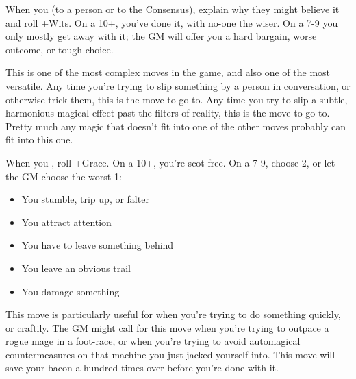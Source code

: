 \begin{multicols}{3}
  \columnbreak
    
  \begin{move}
    When you  (to a person or to the Consensus),
    explain why they might believe it and roll +Wits. On a 10+, you've
    done it, with no-one the wiser. On a 7-9 you only mostly get away
    with it; the GM will offer you a hard bargain, worse outcome, or
    tough choice.
\begin{movedetail}
  This is one of the most complex moves in the game, and also one of
  the most versatile. Any time you're trying to slip something by a
  person in conversation, or otherwise trick them, this is the move to
  go to. Any time you try to slip a subtle, harmonious magical
  effect past the filters of reality, this is the move to go
  to. Pretty much any magic that doesn't fit into one of the other
  moves probably can fit into this one.
\end{movedetail}
  \end{move}

  \vspace{1em}
  
  \SEPARATOR

  \begin{move}
    When you , roll
    +Grace. On a 10+, you're scot free. On a 7-9, choose 2, or let
    the GM choose the worst 1:
    \begin{itemize}
      \setlength\itemsep{0em}
    \item You stumble, trip up, or falter
    \item You attract attention
    \item You have to leave something behind
    \item You leave an obvious trail
    \item You damage something
    \end{itemize}
\begin{movedetail}
  This move is particularly useful for when you're trying to do
  something quickly, or craftily. The GM might call for this move when
  you're trying to outpace a rogue mage in a foot-race, or when you're
  trying to avoid automagical countermeasures on that machine you just
  jacked yourself into. This move will save your bacon a hundred times
  over before you're done with it.
\end{movedetail}
  \end{move}

  \SEPARATOR


\end{multicols}

